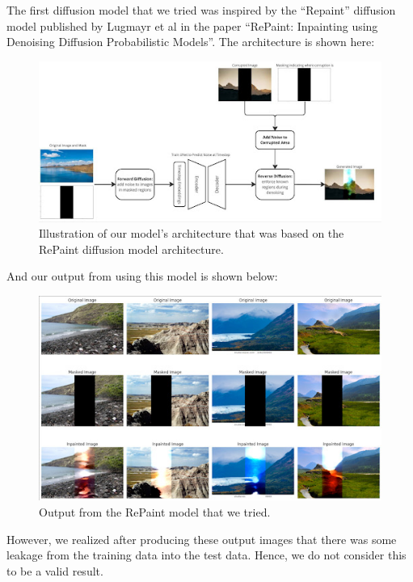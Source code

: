 \documentclass[sigconf]{acmart}
\begin{document}
The first diffusion model that we tried was inspired by the “Repaint” diffusion model published by Lugmayr et al in the paper “RePaint: Inpainting using Denoising Diffusion Probabilistic Models”. The architecture is shown here:

\begin{figure}[h!]
    \centering
    \includegraphics[width=\linewidth]{repaint_architecture}
    \caption{Illustration of our model's architecture that was based on the RePaint diffusion model architecture.}
    \label{fig:repaint_architecture}
\end{figure}

And our output from using this model is shown below:

\begin{figure}[h!]
    \centering
    \includegraphics[width=\linewidth]{repaint_results}
    \caption{Output from the RePaint model that we tried.}
    \label{fig:repaint_results}
\end{figure}

However, we realized after producing these output images that there was some leakage from the training data into the test data. Hence, we do not consider this to be a valid result.
\end{document}
